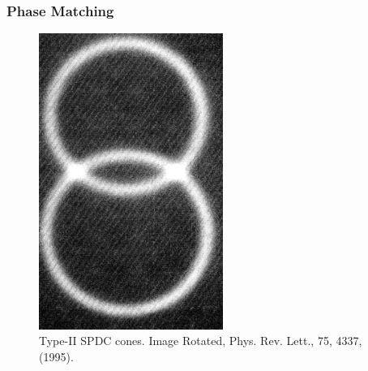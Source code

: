 \documentclass[serif,8pt]{beamer}
\begin{document}

\begin{frame}[t]
	\frametitle{Phase Matching}
\begin{figure}
	\begin{center}
		\includegraphics[width=6cm,angle=90]{SPDCCones.png}
	\end{center}
	\caption{Type-II SPDC cones. Image Rotated, Phys. Rev. Lett., 75, 4337, (1995).}
\end{figure}

\end{frame}
\end{document}
